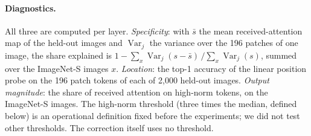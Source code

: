 \paragraph{Diagnostics.} All three are computed per layer. \emph{Specificity}: with $\bar s$ the mean received-attention map of the held-out images and $\operatorname{Var}_j$ the variance over the 196 patches of one image, the share explained is $1-\sum_x\operatorname{Var}_j(s-\bar s)\,/\sum_x\operatorname{Var}_j(s)$, summed over the ImageNet-S images $x$. \emph{Location}: the top-1 accuracy of the linear position probe on the 196 patch tokens of each of 2,000 held-out images. \emph{Output magnitude}: the share of received attention on high-norm tokens, on the ImageNet-S images. The high-norm threshold (three times the median, defined below) is an operational definition fixed before the experiments; we did not test other thresholds. The correction itself uses no threshold.

